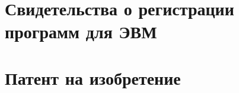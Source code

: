 \chapter{Свидетельства о регистрации программ для ЭВМ} \label{struct:certificates}











\chapter{Патент на изобретение} 

 



